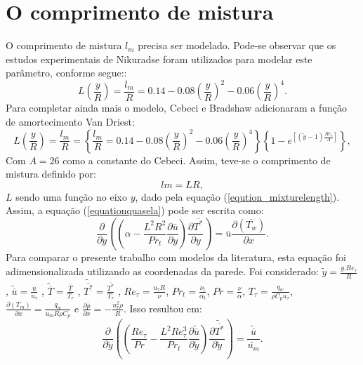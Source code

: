 \section{O comprimento de mistura}

O comprimento de mistura $ l_m $ precisa ser modelado. Pode-se observar que os estudos experimentais de Nikuradse foram utilizados para modelar este parâmetro, conforme segue::
\begin{equation}
L\left(\frac{y}{R}\right) = \frac{l_m}{R} = 0.14 - 0.08 \left(\frac{y}{R}\right)^2 - 0.06\left(\frac{y}{R}\right)^4.
\end{equation}
Para completar ainda mais o modelo, Cebeci e Bradshaw adicionaram a função de amortecimento Van Driest:
\begin{equation}\label{eqution_mixturelength}
L\left(\frac{y}{R}\right)  = \frac{l_m}{R} = \left\{\frac{l_m}{R} = 0.14 - 0.08 \left(\frac{y}{R}\right)^2 - 0.06\left(\frac{y}{R}\right)^4\right\}\left\{  1 - e^{[(\tilde{y} - 1) \frac{Re_\tau}{A}]}\right\},
\end{equation}
Com $A = 26$ como a constante do Cebeci. Assim, teve-se o comprimento de mistura definido por:
\begin{equation}
lm = L R,
\end{equation}
$ L $ sendo uma função no eixo $ y $, dado pela equação (\ref{eqution_mixturelength}). Assim, a equação (\ref{equationquasela}) pode ser escrita como:
\begin{equation}\label{cebeciconstant}
{\frac{\partial{}}{\partial{y}}} \left( \left( \alpha   
- \frac{{L}^2 R ^2}{Pr_t}\frac{\partial \overline{u}}{\partial y} \right) \frac{\partial \overline{T^\ast}}{\partial y} \right)
= 
\overline{u}\frac{\partial{}\left(\overline{T_w}\right)  }{\partial{x}}.
\end{equation}
Para comparar o presente trabalho com modelos da literatura, esta equação foi adimensionalizada utilizando as coordenadas da parede. Foi considerado: $ \tilde{y} = \frac{y . Re_\tau}{R} $, $ \tilde{\overline{u}} = \frac{\overline{u}}{u_\tau} $ , $ \tilde{\overline{T}} = \frac{\overline{T}}{T_\tau} $ , $ \tilde{\overline{T^\ast}} = \frac{\overline{T^\ast}}{T_\tau} $ , $Re_\tau = \frac{u_\tau R}{\nu}$, $Pr_t = \frac{\nu_t}{\alpha_t}$, $Pr = \frac{\nu}{\alpha}$, $T_\tau = \frac{q_w}{\rho C_p u_\tau}$, $\frac{\partial{\left(T_m\right)}}{\partial{x}} = \frac{q_w}{u_m  R \rho  C_p } $ e $\frac{\partial \overline{p}}{\partial x} = - \frac{u_\tau^2 \rho}{R} $. Isso resultou em:
\\
\begin{equation}\label{equationultima}
{\frac{\partial{}}{\partial{\tilde{y}}}} \left( \left( \frac{Re_\tau}{Pr}   
- \frac{{L}^2 Re_\tau ^3}{Pr_t}\frac{\partial \tilde{\overline{u}}}{\partial \tilde{y}} \right) \frac{\partial \tilde{\overline{T^\ast}}}{\partial \tilde{y}} \right)
= 
\frac{\tilde{\overline{u}}}{\tilde{u_m}}.
\end{equation}
